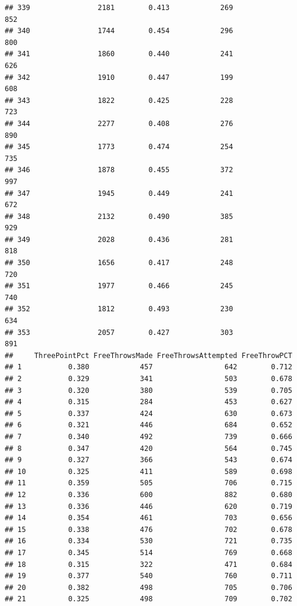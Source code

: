 \documentclass[]{book}
\begin{document}
\begin{verbatim}
## 339                2181        0.413            269                852
## 340                1744        0.454            296                800
## 341                1860        0.440            241                626
## 342                1910        0.447            199                608
## 343                1822        0.425            228                723
## 344                2277        0.408            276                890
## 345                1773        0.474            254                735
## 346                1878        0.455            372                997
## 347                1945        0.449            241                672
## 348                2132        0.490            385                929
## 349                2028        0.436            281                818
## 350                1656        0.417            248                720
## 351                1977        0.466            245                740
## 352                1812        0.493            230                634
## 353                2057        0.427            303                891
##     ThreePointPct FreeThrowsMade FreeThrowsAttempted FreeThrowPCT
## 1           0.380            457                 642        0.712
## 2           0.329            341                 503        0.678
## 3           0.320            380                 539        0.705
## 4           0.315            284                 453        0.627
## 5           0.337            424                 630        0.673
## 6           0.321            446                 684        0.652
## 7           0.340            492                 739        0.666
## 8           0.347            420                 564        0.745
## 9           0.327            366                 543        0.674
## 10          0.325            411                 589        0.698
## 11          0.359            505                 706        0.715
## 12          0.336            600                 882        0.680
## 13          0.336            446                 620        0.719
## 14          0.354            461                 703        0.656
## 15          0.338            476                 702        0.678
## 16          0.334            530                 721        0.735
## 17          0.345            514                 769        0.668
## 18          0.315            322                 471        0.684
## 19          0.377            540                 760        0.711
## 20          0.382            498                 705        0.706
## 21          0.325            498                 709        0.702

\end{verbatim}
\end{document}
